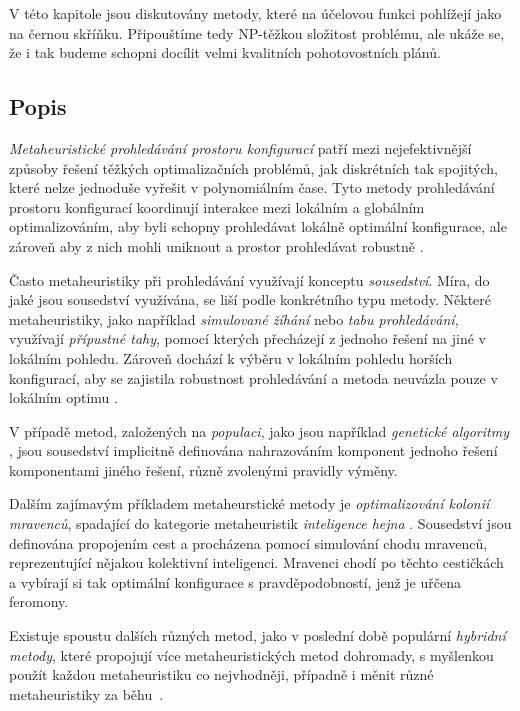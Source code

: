 V této kapitole jsou diskutovány metody, které na účelovou funkci pohlížejí jako na černou skříňku. 
Připouštíme tedy NP-těžkou složitost problému, ale ukáže se, že i tak budeme schopni docílit velmi kvalitních pohotovostních plánů.

\subsection{Popis}

\textit{Metaheuristické prohledávání prostoru konfigurací} patří mezi nejefektivnější způsoby řešení těžkých optimalizačních problémů,
jak diskrétních tak spojitých,
které nelze jednoduše vyřešit v polynomiálním čase.
Tyto metody prohledávání prostoru konfigurací koordinují interakce mezi lokálním a globálním optimalizováním,
aby byli schopny prohledávat lokálně optimální konfigurace, ale zároveň aby z nich mohli uniknout a prostor prohledávat robustně \cite{GlovKoch03}.

Často metaheuristiky při prohledávání využívají konceptu \textit{sousedství}.
Míra, do jaké jsou sousedství využívána, se liší podle konkrétního typu metody.
Některé metaheuristiky, jako například \textit{simulované žíhání} nebo \textit{tabu prohledávání}, využívají \textit{přípustné tahy},
pomocí kterých přecházejí z jednoho řešení na jiné v lokálním pohledu.
Zároveň dochází k výběru v lokálním pohledu horších konfigurací, aby se zajistila robustnost prohledávání
a metoda neuvázla pouze v lokálním optimu \cite{GlovKoch03}.

V případě metod, založených na \textit{populaci}, jako jsou například \textit{genetické algoritmy} \cite{genetic}, jsou sousedství implicitně definována
nahrazováním komponent jednoho řešení komponentami jiného řešení, různě zvolenými pravidly výměny.

Dalším zajímavým příkladem metaheurstické metody je \textit{optimalizování kolonií mravenců}, spadající do kategorie metaheuristik \textit{inteligence hejna} \cite{ACO}.
Sousedství jsou definována propojením cest a procházena pomocí simulování chodu mravenců, reprezentující nějakou kolektivní inteligenci.
Mravenci chodí po těchto cestičkách a vybírají si tak optimální konfigurace s pravděpodobností, jenž je uřčena feromony.

Existuje spoustu dalších různých metod, jako v poslední době populární \textit{hybridní metody},
které propojují více metaheuristických metod dohromady, s myšlenkou použít každou metaheuristiku co nejvhodněji,
případně i měnit různé metaheuristiky za běhu~\cite{HybridMeta}.

